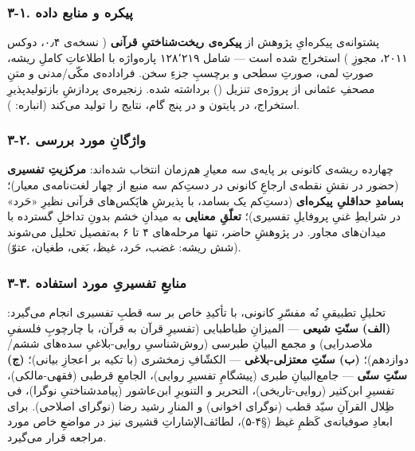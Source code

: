 \begin{RTL}
\begin{otherlanguage}{persian}
\subsubsection{۳-۱. پیکره و منابع
داده}\label{ux67eux6ccux6a9ux631ux647-ux648-ux645ux646ux627ux628ux639-ux62fux627ux62fux647}

پشتوانه‌ی پیکره‌ایِ پژوهش از \textbf{پیکره‌ی ریخت‌شناختیِ قرآنی}
( نسخه‌ی ۰٫۴، دوکس ۲۰۱۱، مجوزِ ) استخراج
شده است --- شامل ۱۲۸٬۲۱۹ پاره‌واژه با اطلاعاتِ کاملِ ریشه، صورتِ لمی، صورتِ
سطحی و برچسبِ جزءِ سخن. فراداده‌ی مکّی/مدنی و متنِ مصحفِ عثمانی از پروژه‌ی
تنزیل () برداشته شده. زنجیره‌ی پردازشِ بازتولیدپذیرِ
استخراج، در پایتون و در پنج گام، نتایج را تولید می‌کند (انباره:
).

\subsubsection{۳-۲. واژگانِ مورد
بررسی}\label{ux648ux627ux698ux6afux627ux646-ux645ux648ux631ux62f-ux628ux631ux631ux633ux6cc}

چهارده ریشه‌ی کانونی بر پایه‌ی سه معیارِ هم‌زمان انتخاب شده‌اند:
\textbf{مرکزیتِ تفسیری} (حضور در نقشِ نقطه‌ی ارجاعِ کانونی در دستِ‌کم سه منبع
از چهار لغت‌نامه‌ی معیار)؛ \textbf{بسامدِ حداقلیِ پیکره‌ای} (دستِ‌کم یک بسامد،
با پذیرشِ هاپَکس‌های قرآنی نظیرِ «حَرد» در شرایطِ غنیِ پروفایلِ تفسیری)؛
\textbf{تعلّقِ معنایی} به میدانِ خشم بدونِ تداخلِ گسترده با میدان‌های مجاور.
در پژوهشِ حاضر، تنها مرحله‌های ۴ تا ۶ به‌تفصیل تحلیل می‌شوند (شش ریشه: غضب،
حَرد، غیظ، بَغی، طغیان، عتوّ).

\subsubsection{۳-۳. منابعِ تفسیریِ مورد
استفاده}\label{ux645ux646ux627ux628ux639-ux62aux641ux633ux6ccux631ux6cc-ux645ux648ux631ux62f-ux627ux633ux62aux641ux627ux62fux647}

تحلیلِ تطبیقیِ نُه مفسّرِ کانونی، با تأکیدِ خاص بر سه قطبِ تفسیری انجام می‌گیرد:
\textbf{(الف) سنّتِ شیعی} --- المیزانِ طباطبایی (تفسیرِ قرآن به قرآن، با
چارچوبِ فلسفیِ ملاصدرایی) و مجمع البیانِ طبرسی (روش‌شناسیِ روایی-بلاغیِ سده‌های
ششم/دوازدهم)؛ \textbf{(ب) سنّتِ معتزلی-بلاغی} --- الکشّافِ زمخشری (با تکیه
بر اعجازِ بیانی)؛ \textbf{(ج) سنّتِ سنّی} --- جامع‌البیانِ طبری (پیشگامِ تفسیرِ
روایی)، الجامعِ قرطبی (فقهی-مالکی)، تفسیرِ ابن‌کثیر (روایی-تاریخی)، التحریر
و التنویرِ ابن‌عاشور (پیامدشناختیِ نوگرا)، فی ظِلال القرآنِ سیّد قطب (نوگرای
اخوانی) و المنارِ رشید رضا (نوگرای اصلاحی). برای ابعادِ صوفیانه‌ی کَظمِ غیظ
(§۴-۵)، لطائف‌الإشاراتِ قشیری نیز در مواضعِ خاص مورد مراجعه قرار می‌گیرد.


\end{otherlanguage}
\end{RTL}
